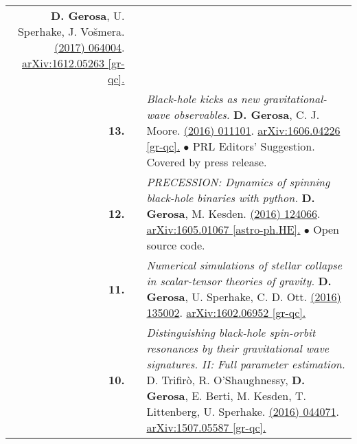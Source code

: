{\begin{longtable}{rp{0.3cm}p{15.8cm}}
\textbf{D. Gerosa}, U. Sperhake, J. Vo\v{s}mera.
\newline{}
\href{http://dx.doi.org/10.1088/1361-6382/aa5e58}{\cqg 34 (2017) 064004}. \href{https://arxiv.org/abs/1612.05263}{arXiv:1612.05263 [gr-qc].}
\vspace{0.09cm}\\
%
\textbf{13.} & & \textit{Black-hole kicks as new gravitational-wave observables.}
\newline{}
\textbf{D. Gerosa}, C. J. Moore.
\newline{}
\href{http://dx.doi.org/10.1103/PhysRevLett.117.011101}{\prl 117 (2016) 011101}. \href{https://arxiv.org/abs/1606.04226}{arXiv:1606.04226 [gr-qc].}
\newline{}
\textcolor{color1}{$\bullet$} PRL Editors' Suggestion. Covered by press release.
\vspace{0.09cm}\\
%
\textbf{12.} & & \textit{PRECESSION: Dynamics of spinning black-hole binaries with python.}
\newline{}
\textbf{D. Gerosa}, M. Kesden.
\newline{}
\href{http://dx.doi.org/10.1103/PhysRevD.93.124066}{\prd 93 (2016) 124066}. \href{https://arxiv.org/abs/1605.01067}{arXiv:1605.01067 [astro-ph.HE].}
\newline{}
\textcolor{color1}{$\bullet$} Open source code.
\vspace{0.09cm}\\
%
\textbf{11.} & & \textit{Numerical simulations of stellar collapse in scalar-tensor theories of gravity.}
\newline{}
\textbf{D. Gerosa}, U. Sperhake, C. D. Ott.
\newline{}
\href{http://dx.doi.org/10.1088/0264-9381/33/13/135002}{\cqg 33 (2016) 135002}. \href{https://arxiv.org/abs/1602.06952}{arXiv:1602.06952 [gr-qc].}
\vspace{0.09cm}\\
%
\textbf{10.} & & \textit{Distinguishing black-hole spin-orbit resonances by their gravitational wave signatures. II: Full parameter estimation.}
\newline{}
D. Trifir\`o, R. O'Shaughnessy, \textbf{D. Gerosa}, E. Berti, M. Kesden, T. Littenberg, U. Sperhake.
\newline{}
\href{http://dx.doi.org/10.1103/PhysRevD.93.044071}{\prd 93 (2016) 044071}. \href{https://arxiv.org/abs/1507.05587}{arXiv:1507.05587 [gr-qc].}
\vspace{0.09cm}\\
%

\end{longtable}}
